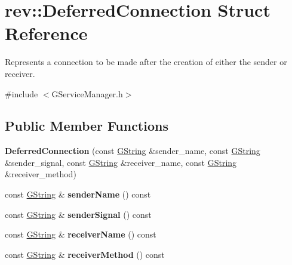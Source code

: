 \hypertarget{classrev_1_1_deferred_connection}{}\section{rev\+::Deferred\+Connection Struct Reference}
\label{classrev_1_1_deferred_connection}


Represents a connection to be made after the creation of either the sender or receiver.  




{\ttfamily \#include $<$G\+Service\+Manager.\+h$>$}

\subsection*{Public Member Functions}
\begin{DoxyCompactItemize}
\item 
\mbox{\label{classrev_1_1_deferred_connection_afb74f13fd101ccbdc89ba690563ba47e}} 
{\bfseries Deferred\+Connection} (const \mbox{\hyperlink{classrev_1_1_g_string}{G\+String}} \&sender\+\_\+name, const \mbox{\hyperlink{classrev_1_1_g_string}{G\+String}} \&sender\+\_\+signal, const \mbox{\hyperlink{classrev_1_1_g_string}{G\+String}} \&receiver\+\_\+name, const \mbox{\hyperlink{classrev_1_1_g_string}{G\+String}} \&receiver\+\_\+method)
\item 
\mbox{\label{classrev_1_1_deferred_connection_acaa11d69e088aec239e960173770e1d1}} 
const \mbox{\hyperlink{classrev_1_1_g_string}{G\+String}} \& {\bfseries sender\+Name} () const
\item 
\mbox{\label{classrev_1_1_deferred_connection_a370740163c33e3b861b2dadfd20d4b14}} 
const \mbox{\hyperlink{classrev_1_1_g_string}{G\+String}} \& {\bfseries sender\+Signal} () const
\item 
\mbox{\label{classrev_1_1_deferred_connection_ae33e1f5b8a81d4327d8353c67831858a}} 
const \mbox{\hyperlink{classrev_1_1_g_string}{G\+String}} \& {\bfseries receiver\+Name} () const
\item 
\mbox{\label{classrev_1_1_deferred_connection_a3ccb651535ea6d2a8a7c7de37401a5df}} 
const \mbox{\hyperlink{classrev_1_1_g_string}{G\+String}} \& {\bfseries receiver\+Method} () const
\end{DoxyCompactItemize}
